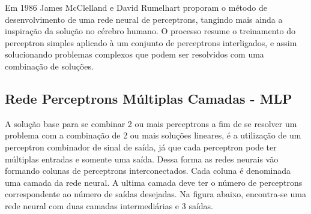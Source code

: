 \documentclass[	12pt, Times, openright, twoside, a4paper, english, brazil]{abntex2}
\begin{document}
	  	 Em 1986 James McClelland e David Rumelhart proporam o método de desenvolvimento de uma rede neural de perceptrons, tangindo mais ainda a inspiração da solução no cérebro humano. O processo resume o treinamento do perceptron simples aplicado à um conjunto de perceptrons interligados, e assim solucionando problemas complexos que podem ser resolvidos com uma combinação de soluções.
	  	  
  	  	  \begin{figure}[H]
  	  	   \end{figure}
  	    \subsection{Rede Perceptrons Múltiplas Camadas - MLP}
  	       
  	       A solução base para se combinar 2 ou mais perceptrons a fim de se resolver um problema com a combinação de 2 ou mais soluções lineares, é a utilização de um perceptron combinador de sinal de saída, já que cada perceptron pode ter múltiplas entradas e somente uma saída. Dessa forma as redes neurais vão formando colunas de perceptrons interconectados. Cada coluna é denominada uma camada da rede neural. A ultima camada deve ter o número de perceptrons correspondente ao número de saídas desejadas. Na figura abaixo, encontra-se uma rede neural com duas camadas intermediárias e 3 saídas.
  	       
  	       \begin{figure}[H]
  	       \end{figure}
         
\end{document}
